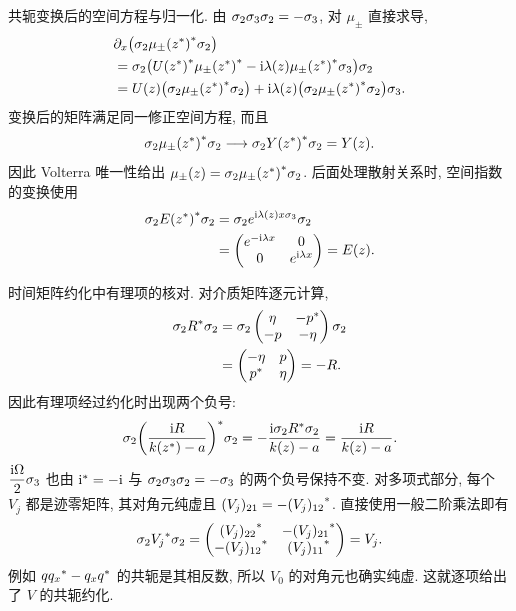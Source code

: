 \par\medskip\noindent 共轭变换后的空间方程与归一化.\quad
由 $\sigma_2\sigma_3\sigma_2=-\sigma_3$, 对 $\mu_\pm$ 直接求导,
\begin{align*}
&\partial_x\bigl(\sigma_2{\mu_\pm({z}^{*})}^{*}\sigma_2\bigr)\\
&=\sigma_2\bigl({U({z}^{*})}^{*}{\mu_\pm({z}^{*})}^{*}
-\mathrm{i}\lambda(z){\mu_\pm({z}^{*})}^{*}\sigma_3\bigr)\sigma_2\\
&=U(z)\bigl(\sigma_2{\mu_\pm({z}^{*})}^{*}\sigma_2\bigr)
+\mathrm{i}\lambda(z)\bigl(\sigma_2{\mu_\pm({z}^{*})}^{*}\sigma_2\bigr)\sigma_3.
\end{align*}
变换后的矩阵满足同一修正空间方程, 而且
\begin{equation*}
\sigma_2{\mu_\pm({z}^{*})}^{*}\sigma_2
\longrightarrow\sigma_2{Y({z}^{*})}^{*}\sigma_2=Y(z).
\end{equation*}
因此 Volterra 唯一性给出
$\mu_\pm(z)=\sigma_2{\mu_\pm({z}^{*})}^{*}\sigma_2$.
后面处理散射关系时, 空间指数的变换使用
\begin{align*}
\sigma_2{E({z}^{*})}^{*}\sigma_2
&=\sigma_2e^{\mathrm{i}\lambda(z)x\sigma_3}\sigma_2\\
&=\begin{pmatrix}e^{-\mathrm{i}\lambda x}&0\\0&e^{\mathrm{i}\lambda x}\end{pmatrix}
=E(z).
\end{align*}

\par\medskip\noindent 时间矩阵约化中有理项的核对.\quad
对介质矩阵逐元计算,
\begin{align*}
\sigma_2{R}^{*}\sigma_2
&=\sigma_2
\begin{pmatrix}\eta&-{p}^{*}\\-p&-\eta\end{pmatrix}\sigma_2\\
&=\begin{pmatrix}-\eta&p\\{p}^{*}&\eta\end{pmatrix}=-R.
\end{align*}
因此有理项经过约化时出现两个负号:
\begin{equation*}
\sigma_2{\left(\dfrac{\mathrm{i} R}{k({z}^{*})-a}\right)}^{*}\sigma_2
=-\dfrac{\mathrm{i}\sigma_2{R}^{*}\sigma_2}{k(z)-a}
=\dfrac{\mathrm{i} R}{k(z)-a}.
\end{equation*}
$\dfrac{\mathrm{i}\Omega}{2}\sigma_3$ 也由
${\mathrm{i}}^{*}=-\mathrm{i}$ 与 $\sigma_2\sigma_3\sigma_2=-\sigma_3$
的两个负号保持不变.
对多项式部分, 每个 $V_j$ 都是迹零矩阵,
其对角元纯虚且 $(V_j)_{21}=-{(V_j)_{12}}^{*}$.
直接使用一般二阶乘法即有
\begin{equation*}
\sigma_2{V_j}^{*}\sigma_2
=\begin{pmatrix}
{(V_j)_{22}}^{*}&-{(V_j)_{21}}^{*}\\
-{(V_j)_{12}}^{*}&{(V_j)_{11}}^{*}
\end{pmatrix}=V_j.
\end{equation*}
例如 $q{q_x}^{*}-q_x{q}^{*}$ 的共轭是其相反数,
所以 $V_0$ 的对角元也确实纯虚.
这就逐项给出了 $V$ 的共轭约化.


